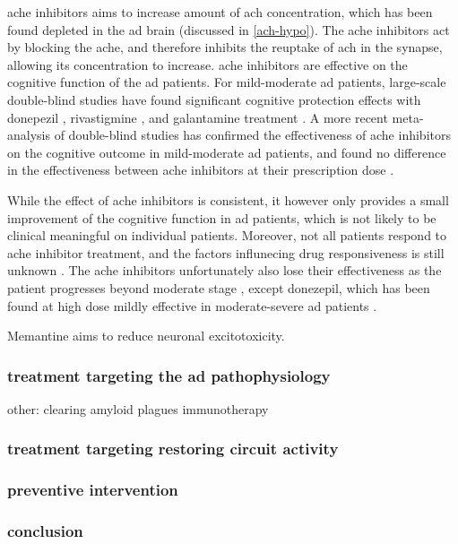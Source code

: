 \Gls{ache} inhibitors aims to increase amount of \gls{ach} concentration, which has been found depleted in the \gls{ad} brain (discussed in \ref{ach-hypo}). The \gls{ache} inhibitors act by blocking the \gls{ache}, and therefore inhibits the reuptake of \gls{ach} in the synapse, allowing its concentration to increase. \Gls{ache} inhibitors are effective on the cognitive function of the \gls{ad} patients. For mild-moderate \gls{ad} patients, large-scale double-blind studies have found significant cognitive protection effects with donepezil \citep{rogers98}, rivastigmine \citep{farlow00}, and galantamine treatment \citep{wilkinson01}. A more recent meta-analysis of double-blind studies has confirmed the effectiveness of \gls{ache} inhibitors on the cognitive outcome in mild-moderate \gls{ad} patients, and found no difference in the effectiveness between \gls{ache} inhibitors at their prescription dose \citep{tan14}.

While the effect of \gls{ache} inhibitors is consistent, it however only provides a small improvement of the cognitive function in \gls{ad} patients, which is not likely to be clinical meaningful on individual patients. Moreover, not all patients respond to \gls{ache} inhibitor treatment, and the factors influnecing drug responsiveness is still unknown \citep{putt2006}. The \gls{ache} inhibitors unfortunately also lose their effectiveness as the patient progresses beyond moderate stage \citep{gillette-guyonnet11}, except donezepil, which has been found at high dose mildly effective in moderate-severe \gls{ad} patients \citep{sabbagh13}. 

Memantine aims to reduce neuronal excitotoxicity.  


\subsubsection{treatment targeting the \gls{ad} pathophysiology}
other: clearing amyloid plagues
immunotherapy
\subsubsection{treatment targeting restoring circuit activity}
\subsubsection{preventive intervention}
\subsubsection{conclusion}

